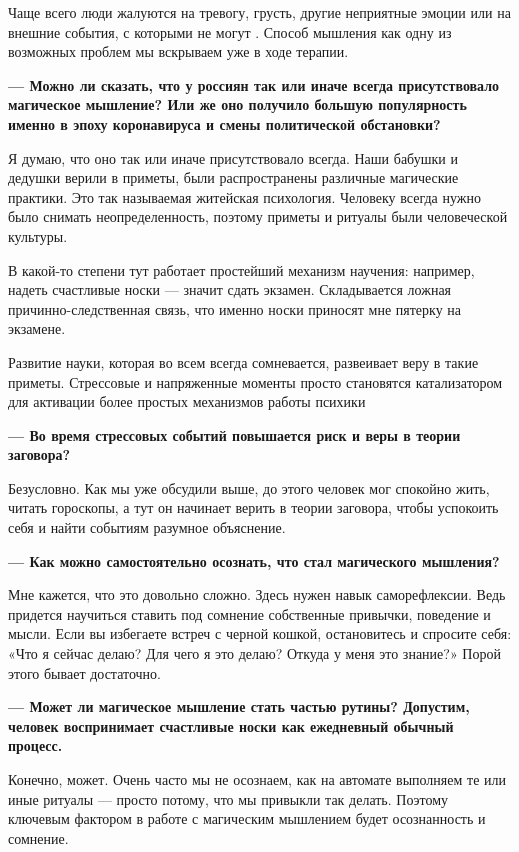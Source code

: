 Чаще всего люди жалуются на тревогу, грусть, другие неприятные эмоции или на внешние события, с которыми не могут . Способ мышления как одну из возможных проблем мы вскрываем уже в ходе терапии.

\textbf{--- Можно ли сказать, что у россиян так или иначе всегда присутствовало магическое мышление? Или же оно получило большую популярность именно в эпоху коронавируса и смены политической обстановки?}

Я думаю, что оно так или иначе присутствовало всегда. Наши бабушки и дедушки верили в приметы, были распространены различные магические практики. Это так называемая житейская психология. Человеку всегда нужно было снимать неопределенность, поэтому приметы и ритуалы  были  человеческой культуры.

В какой-то степени тут работает простейший механизм научения: например, надеть счастливые носки — значит сдать экзамен. Складывается ложная причинно-следственная связь, что именно носки приносят мне пятерку на экзамене.

\begin{fancyquotes}
    Развитие науки, которая во всем всегда сомневается, развеивает веру в такие приметы. Стрессовые и напряженные моменты просто становятся катализатором для активации более простых механизмов работы психики
\end{fancyquotes}

\textbf{--- Во время стрессовых событий повышается риск  и веры в теории заговора?}

Безусловно. Как мы уже обсудили выше, до этого человек мог спокойно жить, читать гороскопы, а тут он начинает верить в теории заговора, чтобы успокоить себя и найти событиям разумное объяснение.

\textbf{--- Как можно самостоятельно осознать, что стал  магического мышления?}

Мне кажется, что это довольно сложно. Здесь нужен навык саморефлексии. Ведь придется научиться ставить под сомнение собственные привычки, поведение и мысли. Если вы избегаете встреч с черной кошкой, остановитесь и спросите себя: «Что я сейчас делаю? Для чего я это делаю? Откуда у меня это знание?» Порой этого бывает достаточно.

\textbf{--- Может ли магическое мышление стать частью рутины? Допустим, человек воспринимает счастливые носки как ежедневный обычный процесс.}

Конечно, может. Очень часто мы не осознаем, как на автомате выполняем те или иные ритуалы — просто потому, что мы привыкли так делать. Поэтому ключевым фактором в работе с магическим мышлением будет осознанность и сомнение.